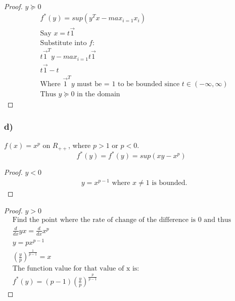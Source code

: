 \documentclass[12pt]{article}
\begin{document}
\begin{proof}{$y \succeq 0$}
\begin{align*}
& f^*(y) = sup(y^Tx - max_{i=1}x_i)\\
& \text{Say } x = t\overrightarrow{1}\\
& \text{Substitute into $f$:}\\
& t\overrightarrow{1}^Ty-max_{i=1}t\overrightarrow{1}\\
& t\overrightarrow{1}-t\\
& \text{Where } \overrightarrow{1}^Ty \text{ must be = 1 to be bounded since $t\in(-\infty, \infty)$}\\
& \text{Thus $y \succeq 0$ in the domain}
\end{align*}
\end{proof}

\subsubsection*{d)}
$f(x) = x^p$ on $R_{++}$, where $p>1$ or $p<0$.
$$f^*(y) = f^*(y) = sup(xy - x^p)$$
\begin{proof}{$y < 0$}
\begin{align*}
& y = x^{p-1} \text{ where } x\not=1 \text{ is bounded.}
\end{align*}
\end{proof}

\begin{proof}{$y > 0$}
\begin{align*}
& \text{Find the point where the rate of change of the difference is 0 and thus bounded:}\\
& \frac{d}{dx}yx = \frac{d}{dx}x^p\\
& y = px^{p-1}\\
& (\frac{y}{p})^{\frac{1}{p-1}} = x\\
& \text{The function value for that value of x is: }\\
& f^*(y) = (p-1)(\frac{y}{p})^{\frac{p}{p-1}}
\end{align*}
\end{proof}

 
\end{document}
